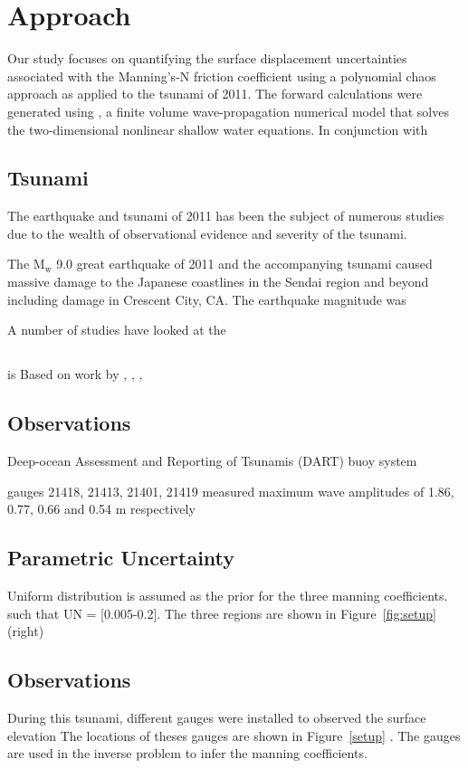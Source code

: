 
\section{Approach}

Our study focuses on quantifying the surface displacement uncertainties associated with the Manning's-N friction coefficient using a polynomial chaos approach as applied to the \tohoku tsunami of 2011.  The forward calculations were generated using \geoclaw, a finite volume wave-propagation numerical model that solves the two-dimensional nonlinear shallow water equations.  In conjunction with 

\subsection{\tohoku Tsunami}

The \tohoku earthquake and tsunami of 2011 has been the subject of numerous studies due to the wealth of observational evidence and severity of the tsunami.  

The $\text{M}_\text{w}$ 9.0 great \tohoku earthquake of 2011 and the accompanying tsunami caused massive damage to the Japanese coastlines in the Sendai region and beyond including damage in Crescent City, CA.  The earthquake magnitude was 

A number of studies have looked at the 

\subsection{\geoclaw}



\geoclaw is Based on work by \cite{MacInnes:2013cr}, \cite{Berger:2011du}, \cite{Berger:2011vi}, \cite{George:2008aa}

\subsection{Observations}

Deep-ocean Assessment and Reporting of Tsunamis (DART) buoy system

gauges 21418, 21413, 21401, 21419 measured maximum wave amplitudes of 1.86, 0.77, 0.66 and 0.54 m respectively







\subsection{Parametric Uncertainty}
Uniform distribution is assumed as the prior for the three manning coefficients.
such that UN = [0.005-0.2]. The three regions are shown in Figure~\ref{fig:setup}(right)

\subsection{Observations}
During this tsunami, different gauges were installed to observed the surface elevation
The locations of theses gauges are shown in Figure~\ref{setup} .
The gauges are used in the inverse problem to infer the manning coefficients.

